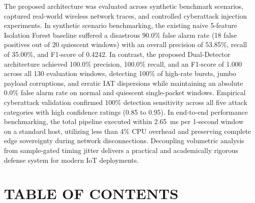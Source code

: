 \documentclass[11pt,a4paper]{report}
\begin{document}
The proposed architecture was evaluated across synthetic benchmark scenarios, captured real-world wireless network traces, and controlled cyberattack injection experiments. In synthetic scenario benchmarking, the existing naive 5-feature Isolation Forest baseline suffered a disastrous 90.0\% false alarm rate (18 false positives out of 20 quiescent windows) with an overall precision of 53.85\%, recall of 35.00\%, and F1-score of 0.4242. In contrast, the proposed Dual-Detector architecture achieved 100.0\% precision, 100.0\% recall, and an F1-score of 1.000 across all 130 evaluation windows, detecting 100\% of high-rate bursts, jumbo payload corruptions, and erratic IAT dispersions while maintaining an absolute 0.0\% false alarm rate on normal and quiescent single-packet windows. Empirical cyberattack validation confirmed 100\% detection sensitivity across all five attack categories with high confidence ratings (0.85 to 0.95). In end-to-end performance benchmarking, the total pipeline executed within 2.65~ms per 1-second window on a standard host, utilizing less than 4\% CPU overhead and preserving complete edge sovereignty during network disconnections. Decoupling volumetric analysis from sample-gated timing jitter delivers a practical and academically rigorous defense system for modern IoT deployments.

\clearpage

\chapter*{TABLE OF CONTENTS}
\thispagestyle{plain}
\setcounter{page}{4}
\vspace*{-10pt}
\end{document}
